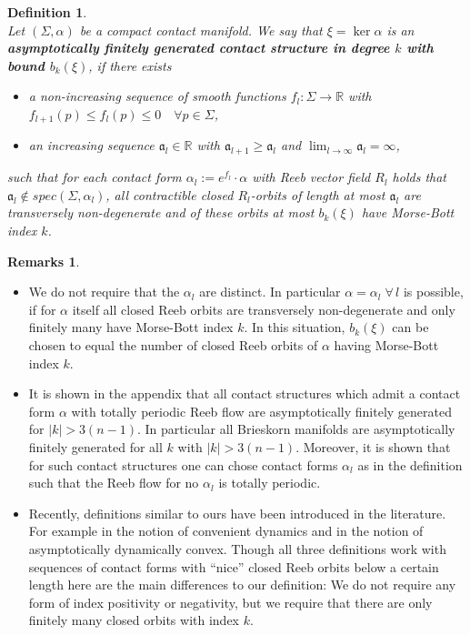 \documentclass[a4paper,12pt,bibliography=totocnumbered,titlepage=false,abstracton,bookmarksnumbered=true]{scrartcl}
\newtheorem{defn}{Definition}
\theoremstyle{definition}
\newtheorem*{rem}{Remarks}
\begin{document}
 \begin{defn}~\\
  Let $(\Sigma,\alpha)$ be a compact contact manifold. We say that $\xi=\ker\alpha$ is an \textbf{asymptotically finitely generated contact structure in degree $k$ with bound $b_k(\xi)$}, if there exists
  \begin{itemize}
   \item a non-increasing sequence of smooth functions $f_l:\Sigma\rightarrow\mathbb{R}$ with \\$f_{l+1}(p)\leq f_l(p)\leq 0\quad\forall p\in\Sigma$,
   \item an increasing sequence $\mathfrak{a}_l\in\mathbb{R}$ with $\mathfrak{a}_{l+1}\geq \mathfrak{a}_l$ and $\lim_{l\rightarrow\infty}\mathfrak{a}_l=\infty$,
  \end{itemize}
such that for each contact form $\alpha_l:=e^{f_l}{\cdot}\alpha$ with Reeb vector field $R_l$ holds that \linebreak $\mathfrak{a}_l\not\in spec(\Sigma,\alpha_l)$, all contractible closed $R_l$-orbits of length at most $\mathfrak{a}_l$ are transversely non-degenerate and of these orbits at most $b_k(\xi)$ have Morse-Bott index $k$.
 \end{defn}
\begin{rem}~
 \begin{itemize}
  \item We do not require that the $\alpha_l$ are distinct. In particular $\alpha=\alpha_l\; \forall\, l$ is possible, if for $\alpha$ itself all closed Reeb orbits are transversely non-degenerate and only finitely many have Morse-Bott index $k$. In this situation, $b_k(\xi)$ can be chosen to equal the number of closed Reeb orbits of $\alpha$ having Morse-Bott index $k$.
  \item It is shown in the appendix that all contact structures which admit a contact form $\alpha$ with totally periodic Reeb flow are asymptotically finitely generated for $|k|>3(n{-}1)$. In particular all Brieskorn manifolds are asymptotically finitely generated for all $k$ with $|k|>3(n{-}1)$. Moreover, it is shown that for such contact structures one can chose contact forms $\alpha_l$ as in the definition such that the Reeb flow for no $\alpha_l$ is totally periodic.
  \item Recently, definitions similar to ours have been introduced in the literature. For example in \cite{KwKo} the notion of convenient dynamics and in \cite{Lazarev} the notion of asymptotically dynamically convex. Though all three definitions work with sequences of contact forms with ``nice'' closed Reeb orbits below a certain length here are the main differences to our definition: We do not require any form of index positivity or negativity, but we require that there are only finitely many closed orbits with index $k$.
 \end{itemize}
\end{rem}
\end{document}
